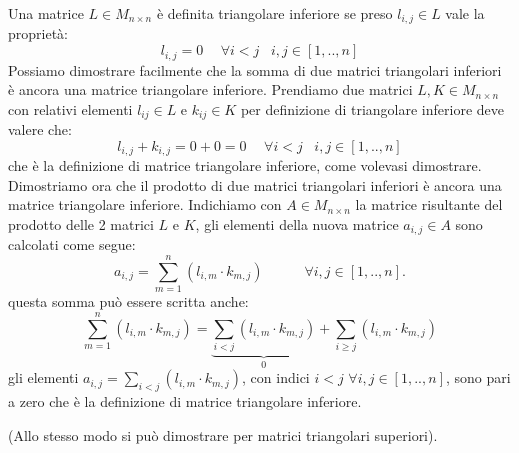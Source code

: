 \begin{flushleft}
Una matrice $L\in M_{n\times n}$ è definita triangolare inferiore se preso $l_{i,j} \in L$ vale la proprietà: 
\[
l_{i,j}=0 \hspace{15pt} \forall i<j \hspace{10pt} i,j \in [1,..,n] 
\]
Possiamo dimostrare facilmente che la somma di due matrici triangolari inferiori è ancora una matrice triangolare inferiore. Prendiamo due matrici $L,K \in M_{n \times n}$ con relativi elementi $l_{ij} \in L$ e $k_{ij} \in K$ per definizione di triangolare inferiore deve valere che:
\[
l_{i,j} + k_{i,j} = 0 + 0 = 0 \hspace{15pt} \forall i<j \hspace{10pt} i,j \in [1,..,n] 
\]
che è la definizione di matrice triangolare inferiore, come volevasi dimostrare. Dimostriamo ora che il prodotto di due matrici triangolari inferiori è ancora una matrice triangolare inferiore. Indichiamo con $A \in M_{n \times n}$ la matrice risultante del prodotto delle 2 matrici $L$ e $K$, gli elementi della nuova matrice $a_{i,j} \in A$ sono calcolati come segue:
\[
a_{i,j} = \sum_{m=1}^n (l_{i,m} \cdot k_{m,j}) \hspace{35pt} \forall i,j \in [1,..,n].
\]
questa somma può essere scritta anche:
\[
\sum_{m=1}^n (l_{i,m} \cdot k_{m,j}) =  \underbrace{ \sum_{i<j} (l_{i,m} \cdot k_{m,j}) }_{0}  + \sum_{i\geq j} (l_{i,m}\cdot k_{m,j})
\]
gli elementi $ a_{i,j} = \sum_{i<j} (l_{i,m} \cdot k_{m,j})$, con indici $i<j$ $\forall i,j \in [1,..,n]$, sono pari a zero che è la definizione di matrice triangolare inferiore.

(Allo stesso modo si può dimostrare per matrici triangolari superiori).
\end{flushleft}